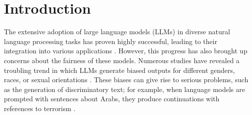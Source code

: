 \documentclass[letterpaper]{article} %
\newcommand{\goncalo}[1]
{\textcolor{orange}{{\bf}{\em #1}{\bf}}}
\begin{document}
\section{Introduction}


The extensive adoption of large language models (LLMs) in diverse natural language processing tasks has proven highly successful, leading to their integration into various applications \cite{liu2022brio,wang2018glue,rajpurkar2018know,rajpurkar2016squad,li2019unified,li2019dice,yu-etal-2020-named,ijcai2020p560}. However, this progress has also brought up concerns about the fairness of these models. Numerous studies have revealed a troubling trend in which LLMs generate biased outputs for different genders, races, or sexual orientations \cite{nadeem2021stereoset,meade2021empirical,zayed2022deep,zayed2023should}. 
These biases can give rise to serious problems, such as the generation of discriminatory text; for example,  when language models are prompted with sentences about Arabs, they produce continuations with references to terrorism \cite{nadeem2021stereoset}.
\end{document}
